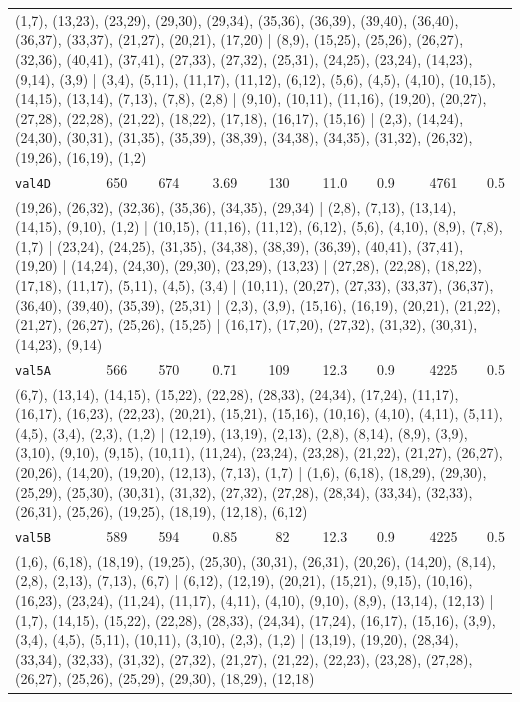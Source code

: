 \begin{landscape}
\begin{longtable}{lrrrrrrrr}
\multicolumn{9}{p{0.96\linewidth}}{\tiny\raggedright\arraybackslash (1,7), (13,23), (23,29), (29,30), (29,34), (35,36), (36,39), (39,40), (36,40), (36,37), (33,37), (21,27), (20,21), (17,20) | (8,9), (15,25), (25,26), (26,27), (32,36), (40,41), (37,41), (27,33), (27,32), (25,31), (24,25), (23,24), (14,23), (9,14), (3,9) | (3,4), (5,11), (11,17), (11,12), (6,12), (5,6), (4,5), (4,10), (10,15), (14,15), (13,14), (7,13), (7,8), (2,8) | (9,10), (10,11), (11,16), (19,20), (20,27), (27,28), (22,28), (21,22), (18,22), (17,18), (16,17), (15,16) | (2,3), (14,24), (24,30), (30,31), (31,35), (35,39), (38,39), (34,38), (34,35), (31,32), (26,32), (19,26), (16,19), (1,2)} \\[2pt]
\texttt{val4D} & 650 & 674 & 3.69 & 130 & 11.0 & 0.9 & 4761 & 0.5 \\
\multicolumn{9}{p{0.96\linewidth}}{\tiny\raggedright\arraybackslash (19,26), (26,32), (32,36), (35,36), (34,35), (29,34) | (2,8), (7,13), (13,14), (14,15), (9,10), (1,2) | (10,15), (11,16), (11,12), (6,12), (5,6), (4,10), (8,9), (7,8), (1,7) | (23,24), (24,25), (31,35), (34,38), (38,39), (36,39), (40,41), (37,41), (19,20) | (14,24), (24,30), (29,30), (23,29), (13,23) | (27,28), (22,28), (18,22), (17,18), (11,17), (5,11), (4,5), (3,4) | (10,11), (20,27), (27,33), (33,37), (36,37), (36,40), (39,40), (35,39), (25,31) | (2,3), (3,9), (15,16), (16,19), (20,21), (21,22), (21,27), (26,27), (25,26), (15,25) | (16,17), (17,20), (27,32), (31,32), (30,31), (14,23), (9,14)} \\[2pt]
\texttt{val5A} & 566 & 570 & 0.71 & 109 & 12.3 & 0.9 & 4225 & 0.5 \\
\multicolumn{9}{p{0.96\linewidth}}{\tiny\raggedright\arraybackslash (6,7), (13,14), (14,15), (15,22), (22,28), (28,33), (24,34), (17,24), (11,17), (16,17), (16,23), (22,23), (20,21), (15,21), (15,16), (10,16), (4,10), (4,11), (5,11), (4,5), (3,4), (2,3), (1,2) | (12,19), (13,19), (2,13), (2,8), (8,14), (8,9), (3,9), (3,10), (9,10), (9,15), (10,11), (11,24), (23,24), (23,28), (21,22), (21,27), (26,27), (20,26), (14,20), (19,20), (12,13), (7,13), (1,7) | (1,6), (6,18), (18,29), (29,30), (25,29), (25,30), (30,31), (31,32), (27,32), (27,28), (28,34), (33,34), (32,33), (26,31), (25,26), (19,25), (18,19), (12,18), (6,12)} \\[2pt]
\texttt{val5B} & 589 & 594 & 0.85 & 82 & 12.3 & 0.9 & 4225 & 0.5 \\
\multicolumn{9}{p{0.96\linewidth}}{\tiny\raggedright\arraybackslash (1,6), (6,18), (18,19), (19,25), (25,30), (30,31), (26,31), (20,26), (14,20), (8,14), (2,8), (2,13), (7,13), (6,7) | (6,12), (12,19), (20,21), (15,21), (9,15), (10,16), (16,23), (23,24), (11,24), (11,17), (4,11), (4,10), (9,10), (8,9), (13,14), (12,13) | (1,7), (14,15), (15,22), (22,28), (28,33), (24,34), (17,24), (16,17), (15,16), (3,9), (3,4), (4,5), (5,11), (10,11), (3,10), (2,3), (1,2) | (13,19), (19,20), (28,34), (33,34), (32,33), (31,32), (27,32), (21,27), (21,22), (22,23), (23,28), (27,28), (26,27), (25,26), (25,29), (29,30), (18,29), (12,18)} \\[2pt]

\end{longtable}
\end{landscape}
